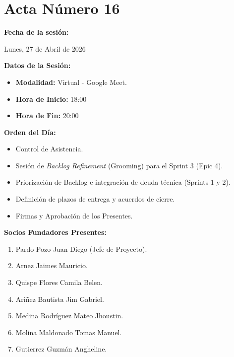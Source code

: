 \newpage
\section{Acta Número 16}
\label{sec:acta16}

\noindent \textbf{Fecha de la sesión:}\par
Lunes, 27 de Abril de 2026

\vspace*{0.5cm}
\noindent \textbf{Datos de la Sesión:}
\vspace{-0.2cm}
\begin{itemize}[noitemsep]
    \item \textbf{Modalidad:} Virtual - Google Meet.
    \item \textbf{Hora de Inicio:} 18:00
    \item \textbf{Hora de Fin:} 20:00
\end{itemize}

\vspace*{0.5cm}
\noindent \textbf{Orden del Día:}
\vspace{-0.2cm}
\begin{itemize}[noitemsep]
    \item Control de Asistencia.
    \item Sesión de \textit{Backlog Refinement} (Grooming) para el Sprint 3 (Epic 4).
    \item Priorización de Backlog e integración de deuda técnica (Sprints 1 y 2).
    \item Definición de plazos de entrega y acuerdos de cierre.
    \item Firmas y Aprobación de los Presentes.
\end{itemize}

\vspace*{0.5cm}
\noindent \textbf{Socios Fundadores Presentes:}
\vspace{-0.2cm}
\begin{enumerate}[noitemsep]
    \item Pardo Pozo Juan Diego (Jefe de Proyecto).
    \item Arnez Jaimes Mauricio.
    \item Quispe Flores Camila Belen.
    \item Ariñez Bautista Jim Gabriel.
    \item Medina Rodríguez Mateo Jhoustin.
    \item Molina Maldonado Tomas Manuel.
    \item Gutierrez Guzmán Angheline.
\end{enumerate}

